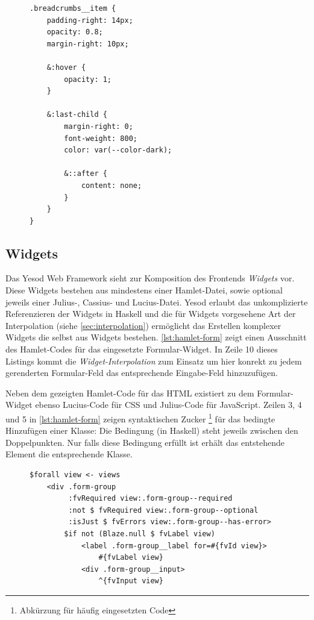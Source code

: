 \documentclass[11pt,a4paper,twoside,ngerman]{article}
\begin{document}
\begin{itemize}
    \begin{figure}[ht]
        \begin{lstlisting}[caption={Beispiel in \textit{Lucius} mit Verschachtelung der Definitionen}, label={lst:lucius-breadcrumbs}]
.breadcrumbs__item {
    padding-right: 14px;
    opacity: 0.8;
    margin-right: 10px;
    
    &:hover {
        opacity: 1;
    }
    
    &:last-child {
        margin-right: 0;
        font-weight: 800;
        color: var(--color-dark);
        
        &::after {
            content: none;
        }
    }
}
        \end{lstlisting}
    \end{figure}
\end{itemize}

\subsection{Widgets}
Das Yesod Web Framework sieht zur Komposition des Frontends \textit{Widgets} vor. Diese Widgets bestehen aus mindestens einer Hamlet-Datei, sowie optional jeweils einer Julius-, Cassius- und Lucius-Datei. Yesod erlaubt das unkomplizierte Referenzieren der Widgets in Haskell und die für Widgets vorgesehene Art der Interpolation (siehe \autoref{sec:interpolation}) ermöglicht das Erstellen komplexer Widgets die selbst aus Widgets bestehen. \autoref{lst:hamlet-form} zeigt einen Ausschnitt des Hamlet-Codes für das eingesetzte Formular-Widget. In Zeile 10 dieses Listings kommt die \textit{Widget-Interpolation} zum Einsatz um hier konrekt zu jedem gerenderten Formular-Feld das entsprechende Eingabe-Feld hinzuzufügen.

Neben dem gezeigten Hamlet-Code für das HTML existiert zu dem Formular-Widget ebenso Lucius-Code für CSS und Julius-Code für JavaScript. Zeilen 3, 4 und 5 in \autoref{lst:hamlet-form} zeigen syntaktischen Zucker \footnote{Abkürzung für häufig eingesetzten Code} für das bedingte Hinzufügen einer Klasse: Die Bedingung (in Haskell) steht jeweils zwischen den Doppelpunkten. Nur falls diese Bedingung erfüllt ist erhält das entstehende Element die entsprechende Klasse.

\begin{figure}[ht]
    \begin{lstlisting}[caption={Ausschnitt aus dem \textit{Hamlet}-Code des Formular-Widgets}, label={lst:hamlet-form}]
$forall view <- views
    <div .form-group
         :fvRequired view:.form-group--required
         :not $ fvRequired view:.form-group--optional
         :isJust $ fvErrors view:.form-group--has-error>
        $if not (Blaze.null $ fvLabel view)
            <label .form-group__label for=#{fvId view}>
                #{fvLabel view}
            <div .form-group__input>
                ^{fvInput view}
    \end{lstlisting}
\end{figure}
\end{document}
